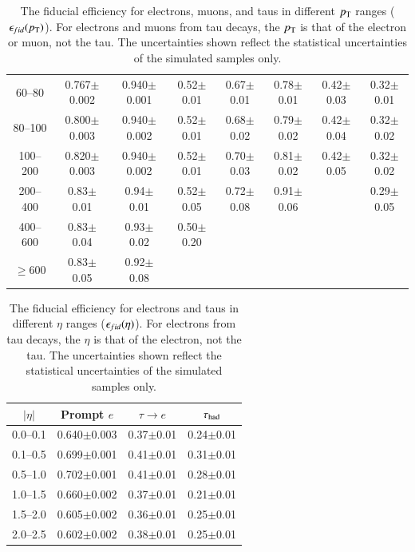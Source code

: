 \begin{table}[htbp]
\begin{center}
{\begin{tabular}{cccccccc}
60--80                & 0.767$\pm$0.002  & 0.940$\pm$0.001& 0.52$\pm$0.01    & 0.67$\pm$0.01         & 0.78$\pm$0.01  & 0.42$\pm$0.03     & 0.32$\pm$0.01\\ 
 80--100              & 0.800$\pm$0.003  & 0.940$\pm$0.002& 0.52$\pm$0.01    & 0.68$\pm$0.02         & 0.79$\pm$0.02  & 0.42$\pm$0.04     & 0.32$\pm$0.02\\ 
100--200              & 0.820$\pm$0.003  & 0.940$\pm$0.002& 0.52$\pm$0.01    & 0.70$\pm$0.03         & 0.81$\pm$0.02  & 0.42$\pm$0.05     & 0.32$\pm$0.02\\ 
200--400              & 0.83$\pm$0.01    & 0.94$\pm$0.01  & 0.52$\pm$0.05    & 0.72$\pm$0.08         & 0.91$\pm$0.06  &                   & 0.29$\pm$0.05\\ 
400--600              & 0.83$\pm$0.04    & 0.93$\pm$0.02  & 0.50$\pm$0.20    \\
$\ge 600$             & 0.83$\pm$0.05    & 0.92$\pm$0.08  &                  \\
 \hline \hline 
 \end{tabular} 
}
\caption{The fiducial efficiency for electrons, muons, and taus in different $p_{\text{T}}$ ranges ($\epsilon_{fid}(p_{\text{T}})$).  For electrons and muons from tau decays, the $p_{\text{T}}$ is that of the electron or muon, not the tau.  The uncertainties shown reflect the statistical uncertainties of the simulated samples only. }
 \label{table:model-independent-fideff-pt} 
 \end{center} 
 \end{table} 

\begin{table}[htbp]
\begin{center}
  {\small
 \begin{tabular}{cccc} 
 \hline \hline 
$|\eta|$ & Prompt $e$& $\tau\rightarrow e$& $\tau_\mathrm{had}$ \\ \hline 
0.0--0.1 & 0.640$\pm$0.003& 0.37$\pm$0.01&   0.24$\pm$0.01\\ 
0.1--0.5 & 0.699$\pm$0.001& 0.41$\pm$0.01&   0.31$\pm$0.01\\ 
0.5--1.0 & 0.702$\pm$0.001& 0.41$\pm$0.01&   0.28$\pm$0.01\\ 
1.0--1.5 & 0.660$\pm$0.002& 0.37$\pm$0.01&   0.21$\pm$0.01\\ 
1.5--2.0 & 0.605$\pm$0.002& 0.36$\pm$0.01&   0.25$\pm$0.01\\ 
2.0--2.5 & 0.602$\pm$0.002& 0.38$\pm$0.01&   0.25$\pm$0.01\\ 
 \hline \hline 
 \end{tabular} 
}
\caption{The fiducial efficiency for electrons and taus in different $\eta$ ranges ($\epsfid(\eta)$).  For electrons from tau decays, the $\eta$ is that of the electron, not the tau.  The uncertainties shown reflect the statistical uncertainties of the simulated samples only.}

 \label{table:model-independent-fideff-eta} 
 \end{center} 
 \end{table}

